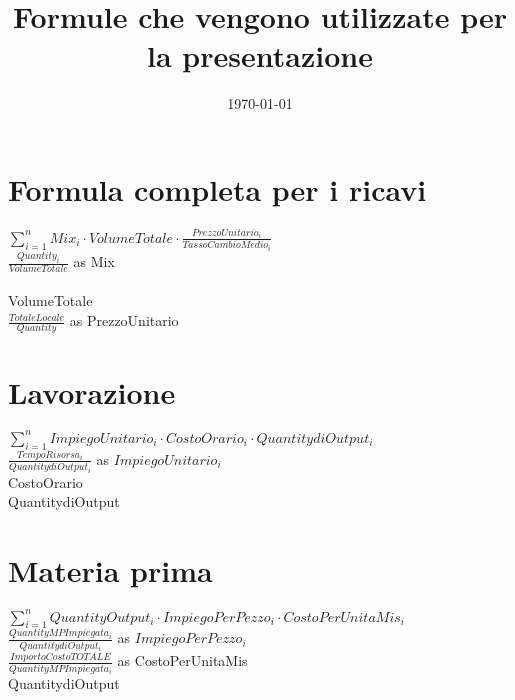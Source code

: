 \documentclass[14pt]{extarticle}
\title{Formule che vengono utilizzate per la presentazione}
\date{\today}
\begin{document}
\maketitle
\section{Formula completa per i ricavi}
$\sum_{i=1} ^{n} Mix_{i}\cdot VolumeTotale \cdot $$\frac{PrezzoUnitario_{i}}{TassoCambioMedio_{i}}$
\bigskip
\\$\frac{Quantity_{i}}{VolumeTotale}$ as Mix\\
\bigskip
\\VolumeTotale
\bigskip
\\$\frac{TotaleLocale}{Quantity}$ as PrezzoUnitario

\section{Lavorazione}
$\sum_{i=1} ^{n} ImpiegoUnitario_i \cdot CostoOrario_i \cdot QuantitydiOutput_i$
\bigskip
\\$\frac{TempoRisorsa_{i}}{QuantitydiOutput_{i}}$ as $ImpiegoUnitario_{i}$
\bigskip
\bigskip
\\CostoOrario
\bigskip
\bigskip
\\QuantitydiOutput

\section{Materia prima}
$\sum_{i=1} ^{n}QuantityOutput_i \cdot ImpiegoPerPezzo_i\cdot CostoPerUnitaMis_i$
\bigskip
\\$\frac{QuantityMPImpiegata_{i}}{QuantitydiOutput_{i}}$ as $ImpiegoPerPezzo_{i}$
\bigskip
\bigskip
\\$\frac {ImportoCostoTOTALE}{QuantityMPImpiegata_{i}}$ as CostoPerUnitaMis
\bigskip
\bigskip
\\QuantitydiOutput
\end{document}
